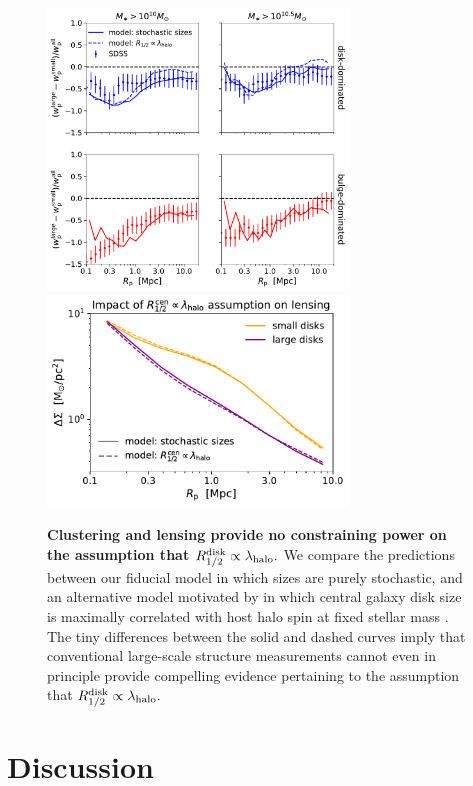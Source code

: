 \documentclass[usenatbib,usegraphicx,letterpaper]{mn2e}
\newcommand{\rhalfdisk}{R_{1/2}^{\rm disk}}
\newcommand{\halospin}{\lambda_{\rm halo}}
\begin{document}
\begin{figure}
\centering
\includegraphics[width=8cm]{FIGS/size_clustering_ratios_bt_decomposition_spin_size_correlation.pdf}
\includegraphics[width=8cm]{FIGS/central_lensing_spin_size_correlation.pdf}
\caption{
{\bf Clustering and lensing provide no constraining power on the assumption that $\rhalfdisk\propto\halospin.$} 
We compare the predictions between our fiducial model in which sizes are purely stochastic, and an alternative model motivated by \citet{mo_mao_white98} in which central galaxy disk size is maximally correlated with host halo spin at fixed stellar mass \citep[implemented via conditional abundance matching, e.g.,][]{hearin_etal13b}. The tiny differences between the solid and dashed curves imply that conventional large-scale structure measurements cannot even in principle provide compelling evidence pertaining to the assumption that $\rhalfdisk\propto\halospin.$ 
}
\label{fig:halospin_lensing}
\end{figure}

\section{Discussion}
\label{sec:discussion}
\end{document}

